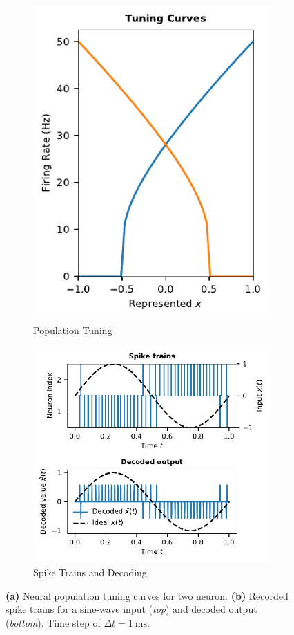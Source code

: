 \documentclass[10pt,letterpaper,oneside]{article}
\begin{document}
\begin{figure}[p]
	\begin{subfigure}[b]{0.4\textwidth}
		\centering
		\includegraphics{media/two_neurons_tuning_curves.pdf}
		\caption{Population Tuning}
	\end{subfigure}
	\begin{subfigure}[b]{0.6\textwidth}
		\centering
		\includegraphics{media/two_neurons_spike_train.pdf}
		\caption{Spike Trains and Decoding}
	\end{subfigure}
	\caption{\textbf{(a)} Neural population tuning curves for two neuron. \textbf{(b)} Recorded spike trains for a sine-wave input (\emph{top}) and decoded output (\emph{bottom}). Time step of $\Delta t = \SI{1}{\milli\second}$. }
	\label{fig:two_neurons}
\end{figure}
\end{document}
